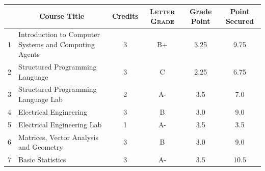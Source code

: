 \documentclass[11pt]{article}
\newcommand*{\numtwo}[1]{\pgfmathprintnumber[
                    fixed, precision=2, fixed zerofill=true]{#1}}
\begin{document}
                \begin{center}
                    \renewcommand{\arraystretch}{1.08}
                    
                \begin{tabular}{|c|l|c|>{\scshape}c|c|c|}
                \hline  \rule[-1ex]{0pt}{3.5ex} {\centering{\bf Course Code}} &  \multicolumn{1}{c|}{\textbf{Course Title}}  & {\bf Credits} & {\bf Letter Grade} & {\bf Grade Point} & {\bf Point Secured}  \\ 
                \hline   1 &  Introduction to Computer Systems and Computing Agents		 & 3 & B+ & 3.25 & 9.75 \\ %
                \hline   2 &  Structured Programming Language		 & 3 & C & 2.25 & 6.75 \\ %
                \hline   3 &  Structured Programming Language Lab		 & 2 & A- & 3.5 & 7.0 \\ %
                \hline   4 &  Electrical Engineering		 & 3 & B & 3.0 & 9.0 \\ %
                \hline   5 &  Electrical Engineering Lab		 & 1 & A- & 3.5 & 3.5 \\ %
                \hline   6 &  Matrices, Vector Analysis and Geometry		 & 3 & B & 3.0 & 9.0 \\ %
                \hline   7 &  Basic Statistics		 & 3 & A- & 3.5 & 10.5 \\ %

\hline                %
                \end{tabular}
                \end{center}
                \renewcommand{\arraystretch}{1.03}
\end{document}
